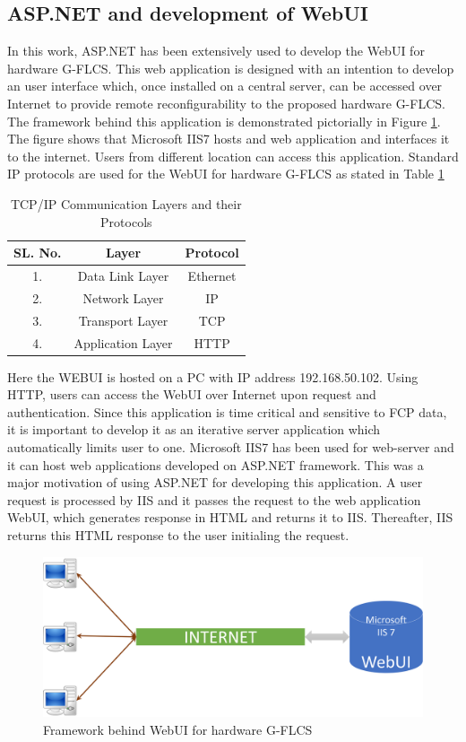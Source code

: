 \subsection{ASP.NET and development of WebUI}
In this work, ASP.NET has been extensively used to develop the WebUI for hardware G-FLCS. This web application is designed with an intention to develop an user interface which, once installed on a central server, can be accessed over Internet to provide remote reconfigurability to the proposed hardware G-FLCS. The framework behind this application is demonstrated pictorially in Figure \ref{fig:fig3_9}. The figure shows that Microsoft IIS7 hosts and web application and interfaces it to the internet. Users from different location can access this application. Standard IP protocols are used for the WebUI for hardware G-FLCS as stated in Table \ref{tab:protocols}
\begin{table}[t]
	\centering
	\caption{TCP/IP Communication Layers and their Protocols}
	\label{tab:protocols}
	\begin{tabular}{ccc}
		\hline SL. No. & Layer & Protocol \\ 
		\hline 1. & Data Link Layer & Ethernet \\ 
		2. & Network Layer & IP \\ 
		3. & Transport Layer & TCP \\ 
		4. & Application Layer & HTTP \\ 
		\hline 
	\end{tabular} 
\end{table}
Here the WEBUI is hosted on a PC with IP address 192.168.50.102. Using HTTP, users can access the WebUI over Internet upon request and authentication. Since this application is time critical and sensitive to FCP data, it is important to develop it as an iterative server application which automatically limits user to one. Microsoft IIS7 has been used for web-server and it can host web applications developed on ASP.NET framework. This was a major motivation of using ASP.NET for developing this application. A user request is processed by IIS and it passes the request to the web application WebUI, which generates response in HTML and returns it to IIS. Thereafter, IIS returns this HTML response to the user initialing the request.
\begin{figure}[h!]
\centering
\includegraphics[width=1\linewidth]{Chapter3/chapter3/Fig9}
\caption[Framework behind WebUI for hardware G-FLCS]{Framework behind WebUI for hardware G-FLCS}
\label{fig:fig3_9}
\end{figure}
 
